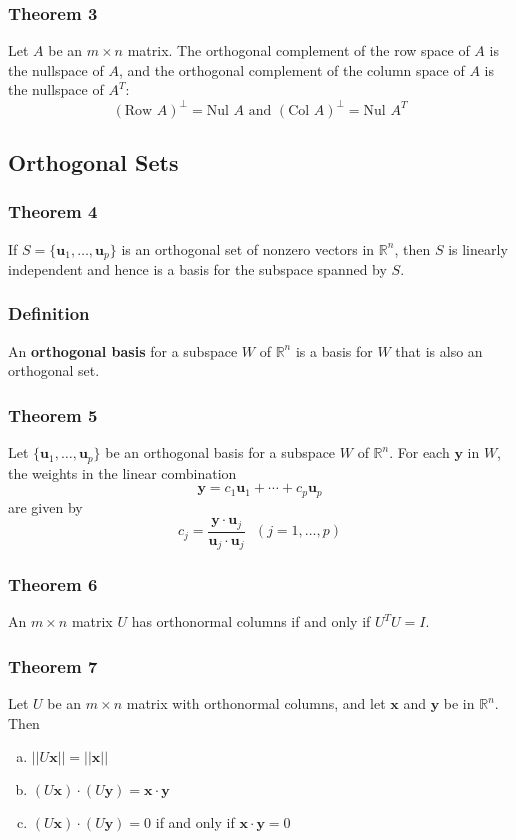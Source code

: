 \documentclass[letterpaper,11pt]{article}
\begin{document}
			\subsubsection{Theorem 3}
				Let $A$ be an $m\times n$ matrix. The orthogonal complement of the row space of $A$ is the nullspace of $A$, and the orthogonal complement of the column space of $A$ is the nullspace of $A^T$:
				\begin{equation}
					(\textrm{Row }A)^\bot=\textrm{Nul }A\textrm{ and }(\textrm{Col }A)^\bot=\textrm{Nul }A^T
				\end{equation}
		\subsection{Orthogonal Sets}
			\subsubsection{Theorem 4}
				If $S=\{\mathbf{u}_1,\dots,\mathbf{u}_p\}$ is an orthogonal set of nonzero vectors in $\mathbb{R}^n$, then $S$ is linearly independent and hence is a basis for the subspace spanned by $S$.
			\subsubsection{Definition}
				An \textbf{orthogonal basis} for a subspace $W$ of $\mathbb{R}^n$ is a basis for $W$ that is also an orthogonal set.
			\subsubsection{Theorem 5}
				Let $\{\mathbf{u}_1,\dots,\mathbf{u}_p\}$ be an orthogonal basis for a subspace $W$ of $\mathbb{R}^n$. For each $\mathbf{y}$ in $W$, the weights in the linear combination
				\begin{equation}
					\mathbf{y}=c_1\mathbf{u}_1+\cdots+c_p\mathbf{u}_p
				\end{equation}
				are given by
				\begin{equation}
					c_j=\frac{\mathbf{y}\cdot\mathbf{u}_j}{\mathbf{u}_j\cdot\mathbf{u}_j}\textrm{   }(j=1,\dots,p)
				\end{equation}
			\subsubsection{Theorem 6}
				An $m\times n$ matrix $U$ has orthonormal columns if and only if $U^TU=I$.
			\subsubsection{Theorem 7}
				Let $U$ be an $m\times n$ matrix with orthonormal columns, and let $\mathbf{x}$ and $\mathbf{y}$ be in $\mathbb{R}^n$. Then
				\begin{enumerate}[a.]
					\item $||U\mathbf{x}||=||\mathbf{x}||$
					\item $(U\mathbf{x})\cdot(U\mathbf{y})=\mathbf{x}\cdot\mathbf{y}$
					\item $(U\mathbf{x})\cdot(U\mathbf{y})=0$ if and only if $\mathbf{x}\cdot\mathbf{y}=0$
				\end{enumerate}
\end{document}
